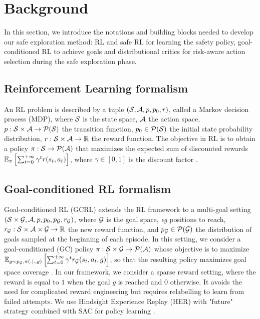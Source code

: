 \section{Background}

In this section, we introduce the notations and building blocks needed to develop our safe exploration method: 
RL and safe RL for learning the safety policy, goal-conditioned RL to achieve goals and distributional critics 
for risk-aware action selection during the safe exploration phase.

\subsection{Reinforcement Learning formalism}
\label{subsection:RL}

An RL problem is described by a tuple $(\mathcal{S}, \mathcal{A}, p, p_0, r)$, called a Markov decision process (MDP),
where $\mathcal{S}$ is the state space, $\mathcal{A}$ the action space,
$p : \mathcal{S} \times \mathcal{A} \to \mathcal{P}(\mathcal{S})$ the transition function, 
$p_0 \in \mathcal{P}(\mathcal{S})$ the initial state probability distribution, 
$r : \mathcal{S} \times \mathcal{A} \to \mathbb{R}$ the reward function. 
The objective in RL is to obtain a policy $\pi : \mathcal{S} \to \mathcal{P}(\mathcal{A})$ 
that maximizes the expected sum of discounted rewards $\mathbb{E}_{\pi} \left[ \sum_{t=0}^{+\infty} \gamma^t r(s_t, a_t) \right]$, where $\gamma \in [0,1]$ is the discount factor \cite{SuttonBartho}.

\subsection{Goal-conditioned RL formalism}
\label{subsection:GCRL}

Goal-conditioned RL (GCRL) extends the RL framework to a multi-goal setting 
$(\mathcal{S} \times \mathcal{G}, \mathcal{A}, p, p_0, p_{\mathcal{G}}, r_{\mathcal{G}})$, where $\mathcal{G}$ is the goal space, 
\textit{eg} positions to reach, $r_{\mathcal{G}} : \mathcal{S} \times \mathcal{A} \times \mathcal{G} \to \mathbb{R}$ the 
new reward function, and $p_{\mathcal{G}} \in \mathcal{P}(\mathcal{G})$ the distribution of goals sampled at the beginning of each episode.
In this setting, we consider a goal-conditioned (GC) policy $\pi : \mathcal{S} \times \mathcal{G} \to \mathcal{P}(\mathcal{A})$ 
whose objective is to maximize $\mathbb{E}_{g\sim p_{\mathcal{G}}, \pi(.|.,g)} \left[ \sum_{t=0}^{+\infty} \gamma^t r_{\mathcal{G}}(s_t, a_t, g) \right]$, 
so that the resulting policy maximizes goal space coverage \cite{UVFA}.
In our framework, we consider a sparse reward setting, where the reward is equal to $1$ when the goal $g$ is reached 
and $0$ otherwise. It avoids the need for complicated reward engineering but requires relabelling to learn from failed attempts.
We use Hindsight Experience Replay (HER) with "future" strategy combined with SAC for
policy learning \cite{HER, SAC}. 

